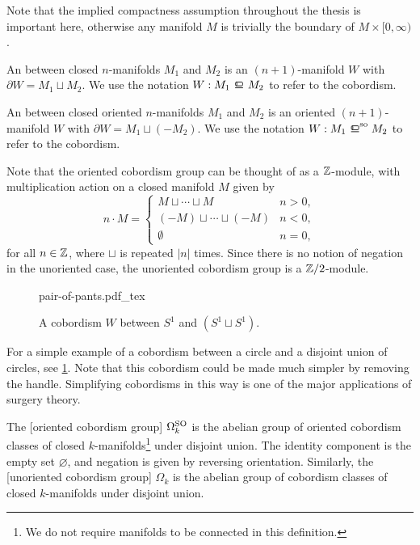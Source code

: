 \begin{remark}
	Note that the implied compactness assumption throughout the thesis is important here, otherwise any manifold $M$ is trivially the boundary of $M\times [0,\infty)$.
\end{remark}

\begin{definition}
	An  between closed $n$-manifolds $M_1$ and $M_2$ is an $(n+1)$-manifold $W$ with $\partial W = M_1\sqcup M_2$. We use the notation $W : M_1\bord M_2$ to refer to the cobordism.
\end{definition}

\begin{definition}
	An  between closed oriented $n$-manifolds $M_1$ and $M_2$ is an oriented $(n+1)$-manifold $W$ with $\partial W = M_1\sqcup (-M_2)$. We use the notation $W : M_1\sobord M_2$ to refer to the cobordism.
\end{definition}

\begin{remark}
\end{remark}

Note that the oriented cobordism group can be thought of as a $\mathbb{Z}$-module, with multiplication action on a closed manifold $M$ given by
\[
	n \cdot M = \begin{cases} M\sqcup \cdots \sqcup M & n > 0,\\ (-M)\sqcup \cdots \sqcup (-M) & n < 0,\\ \emptyset & n=0,\end{cases}
\]
for all $n\in \mathbb{Z}$, where $\sqcup$ is repeated $|n|$ times. Since there is no notion of negation in the unoriented case, the unoriented cobordism group is a $\mathbb{Z}/2$-module.

\begin{figure}[ht]
	\centering
	{pair-of-pants.pdf_tex}
	\caption{A cobordism $W$ between $S^1$ and $(S^1\sqcup S^1)$.}\label{fig:pair-of-pants}
\end{figure}

For a simple example of a cobordism between a circle and a disjoint union of circles, see \cref{fig:pair-of-pants}. Note that this cobordism could be made much simpler by removing the handle. Simplifying cobordisms in this way is one of the major applications of surgery theory.

\begin{definition}
	The [oriented cobordism group] $\Omega^{\mathrm{SO}}_k$ is the abelian group of oriented cobordism classes of closed $k$-manifolds\footnote{We do not require manifolds to be connected in this definition.}
	under disjoint union. The identity component is the empty set $\varnothing$, and negation is given by reversing orientation. Similarly, the [unoriented cobordism group] $\Omega_k$ is the abelian group of cobordism classes of closed $k$-manifolds under disjoint union.
\end{definition}

